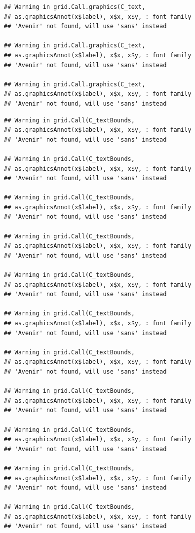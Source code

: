 \documentclass[]{krantz}
\begin{document}
\begin{verbatim}
## Warning in grid.Call.graphics(C_text,
## as.graphicsAnnot(x$label), x$x, x$y, : font family
## 'Avenir' not found, will use 'sans' instead

## Warning in grid.Call.graphics(C_text,
## as.graphicsAnnot(x$label), x$x, x$y, : font family
## 'Avenir' not found, will use 'sans' instead

## Warning in grid.Call.graphics(C_text,
## as.graphicsAnnot(x$label), x$x, x$y, : font family
## 'Avenir' not found, will use 'sans' instead
\end{verbatim}

\begin{verbatim}
## Warning in grid.Call(C_textBounds,
## as.graphicsAnnot(x$label), x$x, x$y, : font family
## 'Avenir' not found, will use 'sans' instead

## Warning in grid.Call(C_textBounds,
## as.graphicsAnnot(x$label), x$x, x$y, : font family
## 'Avenir' not found, will use 'sans' instead

## Warning in grid.Call(C_textBounds,
## as.graphicsAnnot(x$label), x$x, x$y, : font family
## 'Avenir' not found, will use 'sans' instead

## Warning in grid.Call(C_textBounds,
## as.graphicsAnnot(x$label), x$x, x$y, : font family
## 'Avenir' not found, will use 'sans' instead

## Warning in grid.Call(C_textBounds,
## as.graphicsAnnot(x$label), x$x, x$y, : font family
## 'Avenir' not found, will use 'sans' instead

## Warning in grid.Call(C_textBounds,
## as.graphicsAnnot(x$label), x$x, x$y, : font family
## 'Avenir' not found, will use 'sans' instead

## Warning in grid.Call(C_textBounds,
## as.graphicsAnnot(x$label), x$x, x$y, : font family
## 'Avenir' not found, will use 'sans' instead

## Warning in grid.Call(C_textBounds,
## as.graphicsAnnot(x$label), x$x, x$y, : font family
## 'Avenir' not found, will use 'sans' instead

## Warning in grid.Call(C_textBounds,
## as.graphicsAnnot(x$label), x$x, x$y, : font family
## 'Avenir' not found, will use 'sans' instead

## Warning in grid.Call(C_textBounds,
## as.graphicsAnnot(x$label), x$x, x$y, : font family
## 'Avenir' not found, will use 'sans' instead

## Warning in grid.Call(C_textBounds,
## as.graphicsAnnot(x$label), x$x, x$y, : font family
## 'Avenir' not found, will use 'sans' instead


\end{verbatim}
\end{document}
